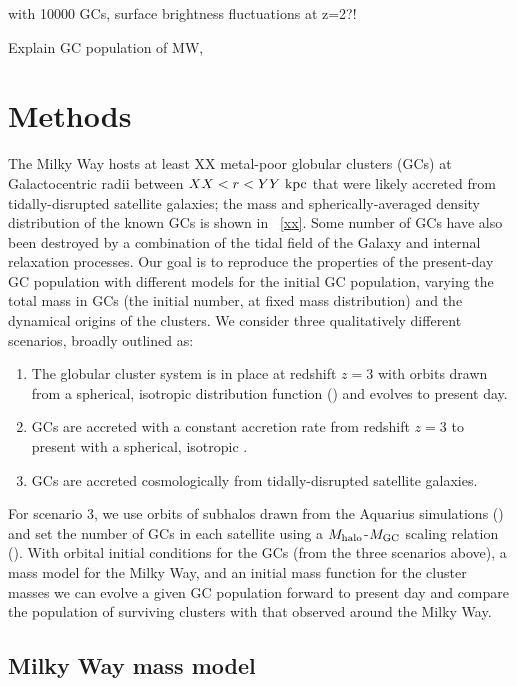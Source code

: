 \documentclass[manuscript, letterpaper]{aastex6}
\begin{document}
with 10000 GCs, surface brightness fluctuations at z=2?!

Explain GC population of MW,

\section{Methods}\label{sec:methods}

The Milky Way hosts at least XX metal-poor globular clusters (GCs) at
Galactocentric radii between $XX < r < YY~\mathrm{kpc}$ that were likely accreted from
tidally-disrupted satellite galaxies;
the mass and spherically-averaged density distribution of the known GCs is shown
in \figname~\ref{xx}.
Some number of GCs have also been destroyed by a combination of the tidal field
of the Galaxy and internal relaxation processes.
Our goal is to reproduce the properties of the present-day GC population with
different models for the initial GC population, varying the total mass in GCs
(the initial number, at fixed mass distribution) and the dynamical origins of
the clusters.
We consider three qualitatively different scenarios, broadly outlined as:
\begin{enumerate}
  \item The globular cluster system is in place at redshift $z=3$ with orbits
    drawn from a spherical, isotropic distribution function () and
    evolves to present day.
  \item GCs are accreted with a constant accretion rate from redshift $z=3$ to
    present with a spherical, isotropic .
  \item GCs are accreted cosmologically from tidally-disrupted satellite
    galaxies.
\end{enumerate}
For scenario 3, we use orbits of subhalos drawn from the Aquarius simulations
(\citealt{aquarius}) and set the number of GCs in each satellite using a $M_{\rm
halo}$-$M_{\rm GC}$ scaling relation (\citealt{Harris:2015}).
With orbital initial conditions for the GCs (from the three scenarios above), a
mass model for the Milky Way, and an initial mass function for the cluster
masses we can evolve a given GC population forward to present day and compare
the population of surviving clusters with that observed around the Milky Way.

\subsection{Milky Way mass model} \label{sec:massmodel}
\end{document}
